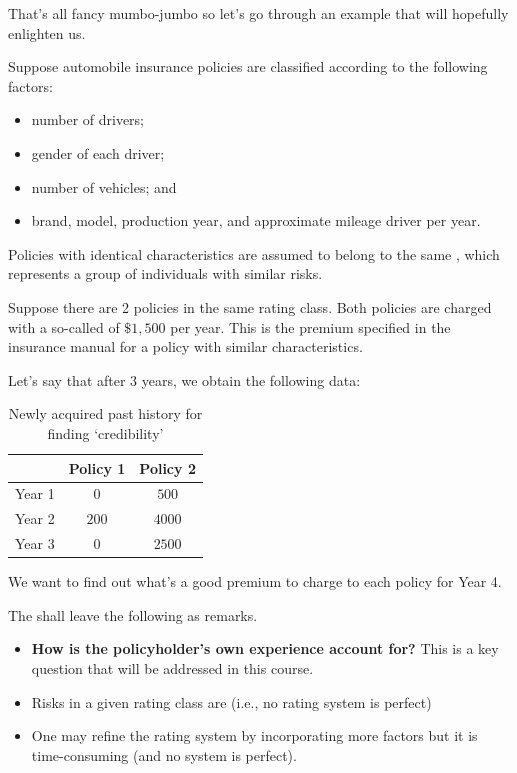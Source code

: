 \documentclass[notoc,notitlepage]{tufte-book}
\begin{document}
That's all fancy mumbo-jumbo so let's go through an example that will hopefully
enlighten us.

\begin{eg}
  Suppose automobile insurance policies are classified according to the
  following factors:
  \begin{itemize}
    \item number of drivers;
    \item gender of each driver;
    \item number of vehicles; and
    \item brand, model, production year, and approximate mileage driver per
      year.
  \end{itemize}
  Policies with identical characteristics are assumed to belong to the same
  , which represents a group of individuals with similar
  risks.

  Suppose there are 2 policies in the same rating class. Both policies are
  charged with a so-called  of $\$1,500$ per year. This
  is the premium specified in the insurance manual for a policy with similar
  characteristics.

  Let's say that after 3 years, we obtain the following data:
  \begin{table}[ht]
    \centering
    \caption{Newly acquired past history for finding `credibility'}
    \label{table:newly_acquired_past_history_for_finding_credibility_}
    \begin{tabular}{c | c c}
             & Policy 1 & Policy 2 \\
      \hline
      Year 1 & $0$      & $500$ \\
      Year 2 & $200$    & $4000$ \\
      Year 3 & $0$      & $2500$
    \end{tabular}
  \end{table}
  We want to find out what's a good premium to charge to each policy for Year 4.
\end{eg}

\begin{remark}
  The shall leave the following as remarks.
  \begin{itemize}
    \item \textbf{How is the policyholder's own experience account for?} This is
      a key question that will be addressed in this course.
    \item Risks in a given rating class are 
      (i.e., no rating system is perfect)
    \item One may refine the rating system by incorporating more factors but it
      is time-consuming (and no system is perfect).
  \end{itemize}
\end{remark}
\end{document}
